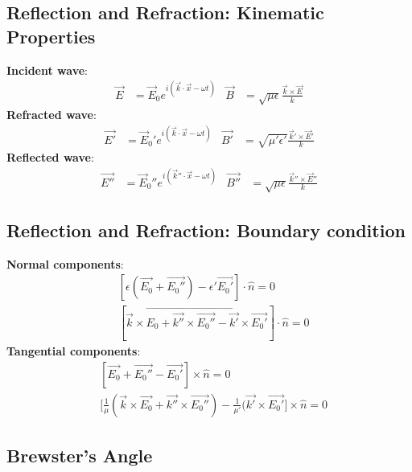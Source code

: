 \documentclass[a4paper, 11pt, landscape]{article}
\begin{document}
\begin{multicols*}{3}
\subsection{Reflection and Refraction: Kinematic Properties}
\begin{compactenum}
	\textbf{Incident wave}:
		\begin{align*}
	        \vec{E} &= \vec{E}_{0}e^{i(\vec{k}\cdot\vec{x} - \omega t)} &
	        \vec{B} &= \sqrt{\mu \epsilon}\frac{\vec{k}\times\vec{E}}{k}
	    \end{align*}
	\textbf{Refracted wave}:
		\begin{align*}
	        \vec{E'} &= \vec{E}_{0}'e^{i(\vec{k}\cdot\vec{x} - \omega t)} &
	        \vec{B'} &= \sqrt{\mu' \epsilon'}\frac{\vec{k}'\times\vec{E}'}{k}
	    \end{align*}
	\textbf{Reflected wave}:
		\begin{align*}
	        \vec{E''} &= \vec{E}_{0}''e^{i(\vec{k}''\cdot\vec{x} - \omega t)} &
	        \vec{B''} &= \sqrt{\mu \epsilon}\frac{\vec{k}''\times\vec{E}''}{k}
	    \end{align*}
\end{compactenum}

\subsection{Reflection and Refraction: Boundary condition}
\begin{compactenum}
\textbf{Normal components}:
	\begin{align*}
        &[\epsilon(\vec{E_{0}} + \vec{E_{0}''}) - \epsilon'\vec{E_{0}'}] \cdot \hat{n} = 0 \\
	&[\vec{k} \times \vec{E_{0} + \vec{k''} \times \vec{E_{0}''} - \vec{k'} \times \vec{E_{0}'}}] \cdot \hat{n} = 0
	\end{align*}
\textbf{Tangential components}:
    \begin{align*}
        &[\vec{E_{0}} + \vec{E_{0}''} - \vec{E_{0}'}] \times \hat{n} = 0 \\
        &\Big[\frac{1}{\mu}(\vec{k} \times \vec{E_{0}} + \vec{k''} \times \vec{E_{0}''}) - \frac{1}{\mu'}(\vec{k'} \times \vec{E_{0}'}\Big] \times \hat{n} = 0
	\end{align*}
\end{compactenum}

\subsection{Brewster’s Angle}
\begin{compactenum}


\end{compactenum}
\end{multicols*}
\end{document}
